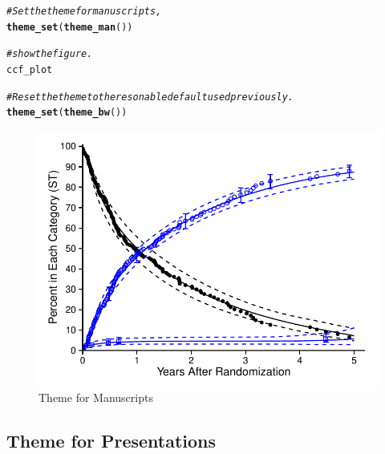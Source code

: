 \documentclass[nojss]{jss}\usepackage[]{graphicx}\usepackage[]{color}
\makeatletter
\def\maxwidth{ %
  \ifdim\Gin@nat@width>\linewidth
    \linewidth
  \else
    \Gin@nat@width
  \fi
}
\newcommand{\hlcom}[1]{\textcolor[rgb]{0.678,0.584,0.686}{\textit{#1}}}%
\newcommand{\hlstd}[1]{\textcolor[rgb]{0.345,0.345,0.345}{#1}}%
\newcommand{\hlkwd}[1]{\textcolor[rgb]{0.737,0.353,0.396}{\textbf{#1}}}%
\newenvironment{kframe}{%
 \def\at@end@of@kframe{}%
 \ifinner\ifhmode%
  \def\at@end@of@kframe{\end{minipage}}%
  \begin{minipage}{\columnwidth}%
 \fi\fi%
 \def\FrameCommand##1{\hskip\@totalleftmargin \hskip-\fboxsep
 \colorbox{shadecolor}{##1}\hskip-\fboxsep
     \hskip-\linewidth \hskip-\@totalleftmargin \hskip\columnwidth}%
 \MakeFramed {\advance\hsize-\width
   \@totalleftmargin\z@ \linewidth\hsize
   \@setminipage}}%
 {\par\unskip\endMakeFramed%
 \at@end@of@kframe}
\newenvironment{knitrout}{}{} %
\makeatother
\begin{document}
\begin{knitrout}\footnotesize
{}\color{fgcolor}\begin{kframe}
\begin{alltt}
\hlcom{# Set the theme for manuscripts,}
\hlkwd{theme_set}\hlstd{(}\hlkwd{theme_man}\hlstd{())}

\hlcom{# show the figure.}
\hlstd{ccf_plot}

\hlcom{# Reset the theme to the resonable default used previously.}
\hlkwd{theme_set}\hlstd{(}\hlkwd{theme_bw}\hlstd{())}
\end{alltt}
\end{kframe}\begin{figure}[htpb]


{\centering \includegraphics[width=\maxwidth]{figure/beamer-manuscriptTheme} 

}

\caption[Theme for Manuscripts]{Theme for Manuscripts\label{F:manuscriptTheme}}
\end{figure}


\end{knitrout}


\subsection{Theme for Presentations}\label{S:themesPPT}
\end{document}
